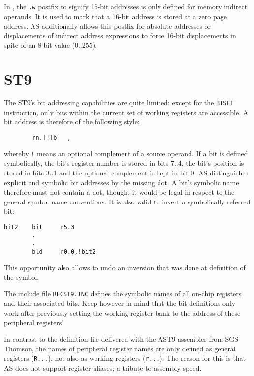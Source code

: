 \documentclass[12pt,twoside]{report}
\newcommand{\tty}[1]{{\tt #1}}
\begin{document}
In \cite{ST7Man}, the \tty{.w} postfix to signify 16-bit addresses is only
defined for memory indirect operands.  It is used to mark that a
16-bit address is stored at a zero page address.  AS additionally
allows this postfix for absolute addresses or displacements of
indirect address expressions to force 16-bit displacements in spite
of an 8-bit value (0..255).


\section{ST9}

The ST9's bit addressing capabilities are quite limited: except for
the \tty{BTSET} instruction, only bits within the current set of working
registers are accessible.  A bit address is therefore of the
following style:
\begin{verbatim}
        rn.[!]b   ,
\end{verbatim}
whereby \tty{!} means an optional complement of a source operand.  If a bit
is defined symbolically, the bit's register number is stored in bits
7..4, the bit's position is stored in bits 3..1 and the optional
complement is kept in bit 0.  AS distinguishes explicit and symbolic
bit addresses by the missing dot.  A bit's symbolic name therefore
must not contain a dot, thought it would be legal in respect to the
general symbol name conventions.  It is also valid to invert a
symbolically referred bit:
\begin{verbatim}
bit2    bit     r5.3
        .
        .
        bld     r0.0,!bit2
\end{verbatim}
This opportunity also allows to undo an inversion that was done at
definition of the symbol.

The include file \tty{REGST9.INC} defines the symbolic names of all on-chip
registers and their associated bits. Keep however in mind that the
bit definitions only work after previously setting the working
register bank to the address of these peripheral registers!

In contrast to the definition file delivered with the AST9 assembler
from SGS-Thomson, the names of peripheral register names are only
defined as general registers (\tty{R...}), not also as working registers
(\tty{r...}).  The reason for this is that AS does not support register
aliases; a tribute to assembly speed.

\end{document}
